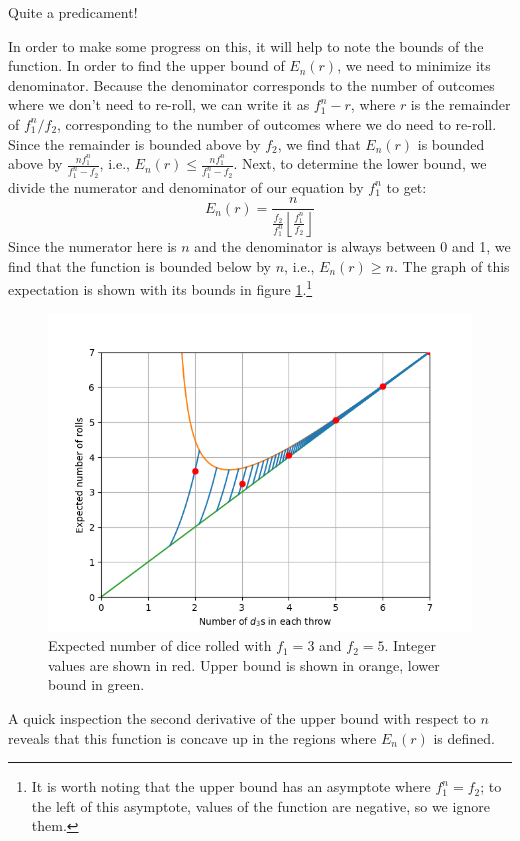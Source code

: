 \documentclass{article}
\begin{document}
Quite a predicament!
\par In order to make some progress on this, it will help to note the bounds of the function.
In order to find the upper bound of $E_n(r)$, we need to minimize its denominator.
Because the denominator corresponds to the number of outcomes where we don't need to re-roll, we can write it as $f_1^n - r$, where $r$ is the remainder of $f_1^n / f_2$, corresponding to the number of outcomes where we do need to re-roll.
Since the remainder is bounded above by $f_2$, we find that $E_n(r)$ is bounded above by $\frac{nf_1^n}{f_1^n-f_2}$, i.e., $E_n(r) \le \frac{nf_1^n}{f_1^n-f_2}$.
Next, to determine the lower bound, we divide the numerator and denominator of our equation by $f_1^n$ to get: $$E_n(r) = \frac{n}{\frac{f_2}{f_1^n} \left \lfloor \frac{f_1^n}{f_2} \right \rfloor}$$
Since the numerator here is $n$ and the denominator is always between 0 and 1, we find that the function is bounded below by $n$, i.e., $E_n(r) \ge n$.
The graph of this expectation is shown with its bounds in figure \ref{fig:num-rolls-with-bounds}.\footnote{It is worth noting that the upper bound has an asymptote where $f_1^n=f_2$; to the left of this asymptote, values of the function are negative, so we ignore them.}
\begin{figure}
    \centering
    \includegraphics[scale=0.5]{num-rolls-with-bounds.png}
    \caption{Expected number of dice rolled with $f_1=3$ and $f_2=5$. Integer values are shown in red. Upper bound is shown in orange, lower bound in green.}
    \label{fig:num-rolls-with-bounds}
\end{figure}
\par A quick inspection the second derivative of the upper bound with respect to $n$ reveals that this function is concave up in the regions where $E_n(r)$ is defined.
\end{document}
